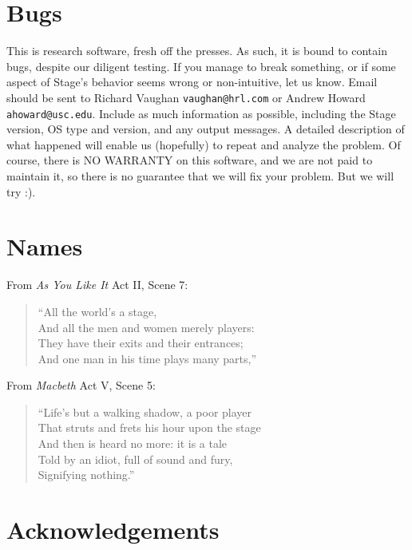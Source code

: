 \documentclass[11pt]{report}
\begin{document}
  \section{Bugs}
  
    This is research software, fresh off the presses.  As such, it is
    bound to contain bugs, despite our diligent testing.  If you
    manage to break something, or if some aspect of Stage's behavior
    seems wrong or non-intuitive, let us know.  Email should be sent
    to Richard Vaughan {\tt vaughan@hrl.com} or Andrew Howard {\tt
    ahoward@usc.edu}.  Include as much information as possible,
    including the Stage version, OS type and version, and any output
    messages.  A detailed description of what happened will enable us
    (hopefully) to repeat and analyze the problem.  Of course, there
    is NO WARRANTY on this software, and we are not paid to maintain
    it, so there is no guarantee that we will fix your problem.  But
    we will try :).

  \section{Names}
    
    From {\sl As You Like It} Act II, Scene 7:
    \begin{quote}
    ``All the world's a stage, \\
    And all the men and women merely players: \\
    They have their exits and their entrances; \\
    And one man in his time plays many parts,''\\
    \end{quote}

    From {\sl Macbeth} Act V, Scene 5:
    \begin{quote}
    ``Life's but a walking shadow, a poor player \\
    That struts and frets his hour upon the stage \\
    And then is heard no more: it is a tale \\
    Told by an idiot, full of sound and fury, \\
    Signifying nothing.''\\
    \end{quote}

  \section{Acknowledgements}
\end{document}
